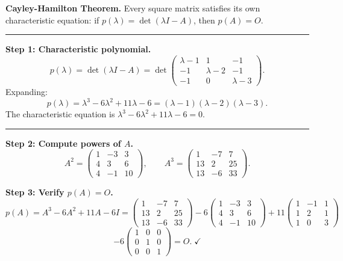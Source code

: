 \documentclass[12pt,a3paper]{article}
\begin{document}
\begin{tcolorbox}[enhanced,breakable,
  colback=cE!4,colframe=cE,boxrule=0.8pt,arc=5pt,
  title={\textbf{Answer --- Cayley-Hamilton \& Inverse for
    $A=\begin{pmatrix}1&-1&1\\1&2&1\\1&0&3\end{pmatrix}$}},
  fonttitle=\bfseries\color{white},colbacktitle=cE]

\textbf{Cayley-Hamilton Theorem.}
Every square matrix satisfies its own characteristic equation:
if $p(\lambda) = \det(\lambda I - A)$, then $p(A) = O$.

\medskip\textcolor{cE}{\rule{\textwidth}{0.4pt}}

\textbf{Step 1: Characteristic polynomial.}
\[
  p(\lambda) = \det(\lambda I - A)
  = \det\begin{pmatrix}\lambda-1&1&-1\\-1&\lambda-2&-1\\-1&0&\lambda-3\end{pmatrix}.
\]
Expanding:
\[
  p(\lambda) = \lambda^3 - 6\lambda^2 + 11\lambda - 6 = (\lambda-1)(\lambda-2)(\lambda-3).
\]
The characteristic equation is $\lambda^3 - 6\lambda^2 + 11\lambda - 6 = 0$.

\medskip\textcolor{cE}{\rule{\textwidth}{0.4pt}}

\textbf{Step 2: Compute powers of $A$.}
\[
  A^2 = \begin{pmatrix}1&-3&3\\4&3&6\\4&-1&10\end{pmatrix}, \qquad
  A^3 = \begin{pmatrix}1&-7&7\\13&2&25\\13&-6&33\end{pmatrix}.
\]

\textbf{Step 3: Verify $p(A) = O$.}
\[
  p(A) = A^3 - 6A^2 + 11A - 6I
  = \begin{pmatrix}1&-7&7\\13&2&25\\13&-6&33\end{pmatrix}
  - 6\begin{pmatrix}1&-3&3\\4&3&6\\4&-1&10\end{pmatrix}
  + 11\begin{pmatrix}1&-1&1\\1&2&1\\1&0&3\end{pmatrix}
\]
\[
- 6\begin{pmatrix}1&0&0\\0&1&0\\0&0&1\end{pmatrix}
  = O.\;\checkmark
\]


\end{tcolorbox}
\end{document}
